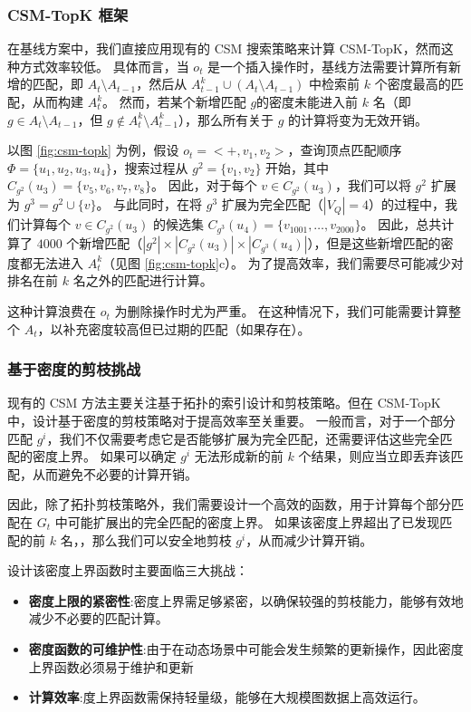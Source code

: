 \subsubsection{CSM-TopK 框架}

在基线方案中，我们直接应用现有的 CSM 搜索策略来计算 CSM-TopK，然而这种方式效率较低。
具体而言，当 $o_t$ 是一个插入操作时，基线方法需要计算所有新增的匹配，即 $A_{t} \setminus A_{t-1}$，然后从 $A_{t-1}^k \cup (A_{t} \setminus A_{t-1})$ 中检索前 $k$ 个密度最高的匹配，从而构建 $A_t^k$。
然而，若某个新增匹配 $g$的密度未能进入前 $k$ 名（即 $g \in A_{t} \setminus A_{t-1}$，但 $g \notin A_{t}^k \setminus A_{t-1}^k$），那么所有关于 $g$ 的计算将变为无效开销。

以图 \ref{fig:csm-topk} 为例，假设 $o_t = <+, v_1, v_2>$，查询顶点匹配顺序 $\Phi = \{u_1, u_2, u_3, u_4\}$，搜索过程从 $g^2 = \{v_1, v_2\}$ 开始，其中 $C_{g^{2}}(u_{3}) = \{v_5, v_6, v_7, v_8\}$。
因此，对于每个 $v \in C_{g^{2}}(u_{3})$，我们可以将 $g^2$ 扩展为 $g^3 = g^2 \cup \{v\}$。
与此同时，在将 $g^3$ 扩展为完全匹配（$|V_Q| = 4$）的过程中，我们计算每个 $v \in C_{g^{2}}(u_{3})$ 的候选集 $C_{g^{3}}(u_{4}) = \{v_{1001}, \dots, v_{2000}\}$。
因此，总共计算了 $4000$ 个新增匹配（$|g^2| \times |C_{g^{2}}(u_{3})| \times |C_{g^{3}}(u_{4})|$），但是这些新增匹配的密度都无法进入 $A^k_t$（见图 \ref{fig:csm-topk}c）。
为了提高效率，我们需要尽可能减少对排名在前 $k$ 名之外的匹配进行计算。


这种计算浪费在 $o_t$ 为删除操作时尤为严重。
在这种情况下，我们可能需要计算整个 $A_{t}$，以补充密度较高但已过期的匹配（如果存在）。

\subsubsection{基于密度的剪枝挑战}

现有的 CSM 方法主要关注基于拓扑的索引设计和剪枝策略。但在 CSM-TopK 中，设计基于密度的剪枝策略对于提高效率至关重要。
一般而言，对于一个部分匹配 $g^i$，我们不仅需要考虑它是否能够扩展为完全匹配，还需要评估这些完全匹配的密度上界。
如果可以确定 $g^i$ 无法形成新的前 $k$ 个结果，则应当立即丢弃该匹配，从而避免不必要的计算开销。

因此，除了拓扑剪枝策略外，我们需要设计一个高效的函数，用于计算每个部分匹配在 $G_t$ 中可能扩展出的完全匹配的密度上界。
如果该密度上界超出了已发现匹配的前 $k$ 名，，那么我们可以安全地剪枝 $g^i$，从而减少计算开销。

设计该密度上界函数时主要面临三大挑战：

\begin{itemize}
    \item \textbf{密度上限的紧密性}:密度上界需足够紧密，以确保较强的剪枝能力，能够有效地减少不必要的匹配计算。
    \item \textbf{密度函数的可维护性}:由于在动态场景中可能会发生频繁的更新操作，因此密度上界函数必须易于维护和更新
    \item \textbf{计算效率}:度上界函数需保持轻量级，能够在大规模图数据上高效运行。
\end{itemize}   


